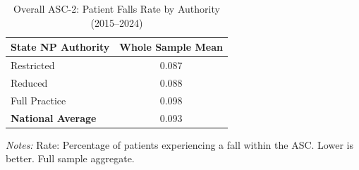\begin{table}[htbp]
    \centering
    \caption{Overall ASC-2: Patient Falls Rate by Authority (2015--2024)}
    \label{tab:asc_rate_2_full}
    \vspace{0.2cm}
    \begin{tabular}{lc}
        \toprule
        \textbf{State NP Authority} & \textbf{Whole Sample Mean} \\
        \midrule
        Restricted & 0.087 \\
        Reduced & 0.088 \\
        Full Practice & 0.098 \\
        \midrule
        \textbf{National Average} & 0.093 \\
        \bottomrule
    \end{tabular}
    \vspace{0.1cm}
    \begin{minipage}{0.6\textwidth}
        \footnotesize \textit{Notes:} Rate: Percentage of patients experiencing a fall within the ASC. Lower is better. Full sample aggregate.
    \end{minipage}
\end{table}